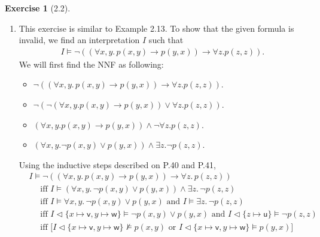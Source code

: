 \documentclass[12pt, psamsfonts]{amsart}
\theoremstyle{definition}
\newtheorem*{exer}{Exercise}
\theoremstyle{remark}
\numberwithin{equation}{subsection}
\begin{document}
\begin{exer}[2.2]
    $ $
    \begin{enumerate}[label=(\alph*)]
        \item %
            This exercise is similar to Example 2.13.
            To show that the given formula is invalid, we find an interpretation $I$ such that
            \begin{align*}
                I \models \neg((\forall x, y.\, p(x, y) \rightarrow p(y, x)) \rightarrow \forall z. p(z, z)).
            \end{align*}
            We will first find the NNF as following:
            \begin{itemize}
                \item
                    $\neg((\forall x, y.\, p(x, y) \rightarrow p(y, x)) \rightarrow \forall z. p(z, z))$.
                \item
                    $\neg(\neg(\forall x, y . p(x, y) \rightarrow p(y, x)) \lor \forall z. p(z, z))$.
                \item
                    $(\forall x, y . p(x, y) \rightarrow p(y, x)) \land \neg \forall z. p(z, z)$.
                \item
                    $(\forall x, y . \neg p(x, y) \lor p(y, x)) \land \exists z. \neg p(z, z)$.
            \end{itemize}
            Using the inductive steps described on P.40 and P.41,
            \begin{align*}
                &I \models \neg((\forall x, y.\, p(x, y) \rightarrow p(y, x)) \rightarrow \forall z.\, p(z, z)) \\
                    &\quad \text{ iff } I \models (\forall x, y.\, \neg p(x, y) \lor p(y, x)) \land \exists z.\, \neg p(z, z) \\
                    &\quad \text{ iff } I \models \forall x, y.\, \neg p(x, y) \lor p(y, x) \text{ and } I \models \exists z.\, \neg p(z, z) \\
                    &\quad \text{ iff } I \vartriangleleft \{ x \mapsto \textsf{v}, y \mapsto \textsf{w} \} \models \neg p(x, y) \lor p(y, x)
                                            \text{ and } I \vartriangleleft \{ z \mapsto \textsf{u} \} \models \neg p(z, z) \\
                    &\quad \text{ iff } \big[I \vartriangleleft \{ x \mapsto \textsf{v}, y \mapsto \textsf{w} \} \not\models p(x, y)
                                    \text{ or } I \vartriangleleft \{ x \mapsto \textsf{v}, y \mapsto \textsf{w} \} \models p(y, x)\big]  \\

\end{align*}
\end{enumerate}
\end{exer}
\end{document}
